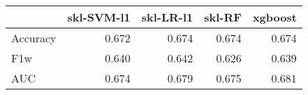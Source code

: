\begin{tabular}{lrrrr}
\toprule
{} &  skl-SVM-l1 &  skl-LR-l1 &  skl-RF &  xgboost \\
\midrule
Accuracy &       0.672 &      0.674 &   0.674 &    0.674 \\
F1w      &       0.640 &      0.642 &   0.626 &    0.639 \\
AUC      &       0.674 &      0.679 &   0.675 &    0.681 \\
\bottomrule
\end{tabular}
